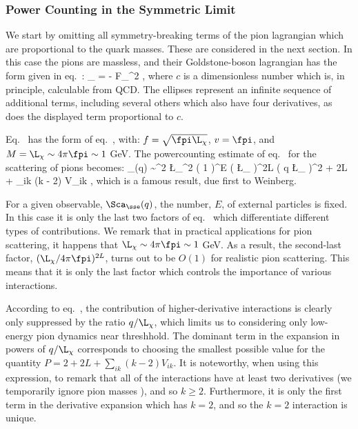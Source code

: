 \documentclass[12pt,epsf]{report}
\begin{document}
\subsubsection{Power Counting in the Symmetric Limit}

We start by omitting all symmetry-breaking terms of the
pion lagrangian which are proportional to the quark masses.
These are considered in the next section. In this case the
pions are massless, and their Goldstone-boson lagrangian
has the form given in 
eq.~: 
%
\eq
\label{chiPT}
\Scl_{\pi \pi} = - {F_\pi^2 } \;
, \eeq
%
where $c$ is a dimensionless number which is, in principle,
calculable from QCD. The ellipses represent an infinite
sequence of additional terms, including several others
which also have four derivatives, as does the displayed
term proportional to $c$.

Eq.~ has the form of eq.~, with:  
$f = \sqrt{\fpi \L_\chi}$, $v = \fpi$, and $M = \L_\chi
\sim 4 
\pi \fpi \sim 1$ GeV. The powercounting estimate of 
eq.~ for the scattering of pions becomes:
%
\eq
\label{ChPTpcapp}
\tilde\Sca_\sse(q) \sim \fpi^2 \L_\chi^2 
\; \left( {1 \over \fpi} \right)^E \;
\left( {\L_\chi {} \pi \fpi} \right)^{2L} 
\; \left( {q \over \L_\chi}
\right)^{2 + 2L + \sum_{ik} (k - 2) 
V_{ik}} , \eeq
%
which is a famous result, due first to Weinberg.

For a given observable, $\Sca_\sse(q)$, the number, $E$, of
external particles is fixed. In this case it is only the
last two factors of eq.~ which
differentiate different types of contributions. We remark
that in practical applications for pion scattering, it
happens that  $\L_\chi \sim 4 \pi \fpi \sim 1$ GeV. As a
result, the second-last factor, $(\L_\chi / 4 \pi
\fpi)^{2L}$, turns out to be $O(1)$ for realistic pion
scattering. This means that it is only the last factor
which controls the importance of various interactions.

According to eq.~, the contribution of
higher-derivative interactions is clearly only suppressed
by the ratio 
$q/\L_\chi$, which limits us to considering only low-energy
pion dynamics near threshhold. The dominant term in the
expansion in powers of $q/\L_\chi$ corresponds to choosing
the smallest possible value for the quantity $P = 2 + 2L +
\sum_{ik} (k - 2) V_{ik}$. It is noteworthy, when using
this expression, to remark that all of the interactions
have at least two derivatives (we temporarily ignore 
pion masses \etc),
and so $k \geq 2$. Furthermore, it is only the first term in
the derivative expansion which has $k=2$, and so the $k=2$
interaction is unique. 
\end{document}
